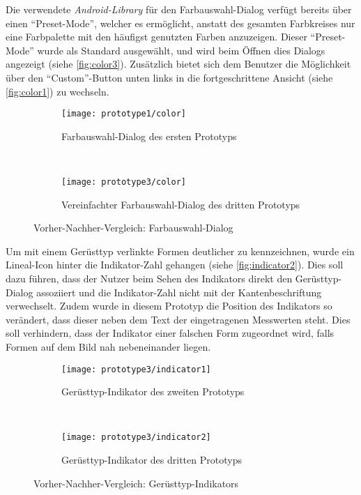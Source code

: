 Die verwendete \emph{Android-Library} für den Farbauswahl-Dialog verfügt bereits über einen ``Preset-Mode'', welcher es ermöglicht, anstatt des gesamten Farbkreises nur eine Farbpalette mit den häufigst genutzten Farben anzuzeigen.
Dieser ``Preset-Mode'' wurde als Standard ausgewählt, und wird beim Öffnen dies Dialogs angezeigt (siehe \autoref{fig:color3}).
Zusätzlich bietet sich dem Benutzer die Möglichkeit über den ``Custom''-Button unten links in die fortgeschrittene Ansicht (siehe \autoref{fig:color1}) zu wechseln. \\

\begin{figure}[h]
  \begin{subfigure}[t]{0.4\textwidth}
    \centering
    \texttt{[image: prototype1/color]}
    \caption{Farbauswahl-Dialog des ersten Prototyps}
    \label{fig:color1}
  \end{subfigure}
  ~
  \begin{subfigure}[t]{0.4\textwidth}
    \centering
    \texttt{[image: prototype3/color]}
    \caption{Vereinfachter Farbauswahl-Dialog des dritten Prototyps}
    \label{fig:color3}
  \end{subfigure}
  \centering
  \caption{Vorher-Nachher-Vergleich: Farbauswahl-Dialog}
\end{figure}

Um mit einem Gerüsttyp verlinkte Formen deutlicher zu kennzeichnen, wurde ein Lineal-Icon hinter die Indikator-Zahl gehangen (siehe \autoref{fig:indicator2}).
Dies soll dazu führen, dass der Nutzer beim Sehen des Indikators direkt den Gerüsttyp-Dialog assoziiert und die Indikator-Zahl nicht mit der Kantenbeschriftung verwechselt.
Zudem wurde in diesem Prototyp die Position des Indikators so verändert, dass dieser neben dem Text der eingetragenen Messwerten steht.
Dies soll verhindern, dass der Indikator einer falschen Form zugeordnet wird, falls Formen auf dem Bild nah nebeneinander liegen. \\

\begin{figure}[h]
  \begin{subfigure}[t]{0.4\textwidth}
    \centering
    \texttt{[image: prototype3/indicator1]}
    \caption{Gerüsttyp-Indikator des zweiten Prototyps}
    \label{fig:indicator1}
  \end{subfigure}
  ~
  \begin{subfigure}[t]{0.4\textwidth}
    \centering
    \texttt{[image: prototype3/indicator2]}
    \caption{Gerüsttyp-Indikator des dritten Prototyps}
    \label{fig:indicator2}
  \end{subfigure}
  \centering
  \caption{Vorher-Nachher-Vergleich: Gerüsttyp-Indikators}
  \label{fig:indicators}
\end{figure}

